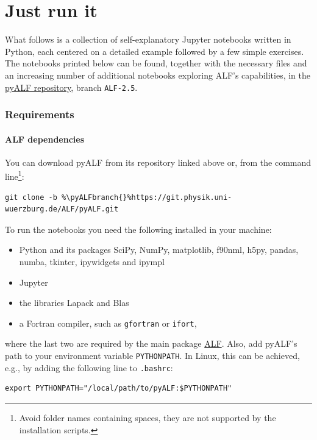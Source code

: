 \documentclass[10pt,modern]{scrartcl}
\numberwithin{exerciseitem}{exercise} %
\newcommand{\ALFbranch}{ALF-2.5}   %
\newcommand{\pyALFbranch}{ALF-2.5} %
\begin{document}
%
%

\part{Just run it}

What follows is a collection of self-explanatory Jupyter notebooks written in Python, each centered on a detailed example followed by a few simple exercises. The notebooks printed below can be found, together with the necessary files and an increasing number of additional notebooks exploring ALF's capabilities, in the \href{https://git.physik.uni-wuerzburg.de/ALF/pyALF/-/tree/\pyALFbranch}{pyALF repository}, branch \texttt{\pyALFbranch{}}.


\section*{Requirements}

\subsection*{ALF dependencies}

You can download pyALF from its repository linked above or, from the command line\footnote{Avoid folder names containing spaces, they are not supported by the installation scripts.}:
\begin{lstlisting}[style=bash,escapechar=\%]
git clone -b %\pyALFbranch{}%https://git.physik.uni-wuerzburg.de/ALF/pyALF.git
\end{lstlisting}
To run the notebooks you need the following installed in your machine:
\begin{itemize}
	\item Python and its packages SciPy, NumPy, matplotlib, f90nml, h5py, pandas, numba, tkinter, ipywidgets and ipympl
	\item Jupyter
	\item the libraries Lapack and Blas
	\item a Fortran compiler, such as \texttt{gfortran} or \texttt{ifort},
\end{itemize}
where the last two are required by the main package \href{https://git.physik.uni-wuerzburg.de/ALF/ALF/-/tree/\ALFbranch}{ALF}. %
Also, add pyALF's path to your environment variable \texttt{PYTHONPATH}. In Linux, this can be achieved, e.g., by adding the following line to \texttt{.bashrc}:
\begin{lstlisting}[style=bash]
export PYTHONPATH="/local/path/to/pyALF:$PYTHONPATH"
\end{lstlisting}
\end{document}
